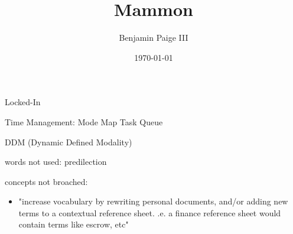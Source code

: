 \title{\bf Mammon}
\author{Benjamin Paige III}
\date{\today}



Locked-In

Time Management:
Mode Map
Task Queue

DDM (Dynamic Defined Modality)


words not used:
predilection


concepts not broached:

\begin{itemize}
\item
"increase vocabulary by rewriting personal documents, and/or adding new terms to a contextual reference sheet.
.e. a finance reference sheet would contain terms like escrow, etc"
\end{itemize}

